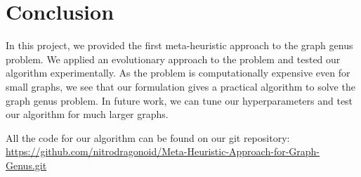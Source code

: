 \documentclass{article}
\begin{document}
\section{Conclusion}\label{sec: con}
In this project, we provided the first meta-heuristic approach to the graph genus problem. 
We applied an evolutionary approach to the problem and tested our algorithm experimentally.
As the problem is computationally expensive even for small graphs, we see that our formulation gives a practical algorithm to solve the graph genus problem.
In future work, we can tune our hyperparameters and test our algorithm for much larger graphs.

All the code for our algorithm can be found on our git repository: \href{https://github.com/nitrodragonoid/Meta-Heuristic-Approach-for-Graph-Genus.git}{\url{https://github.com/nitrodragonoid/Meta-Heuristic-Approach-for-Graph-Genus.git}}

 

\end{document}
